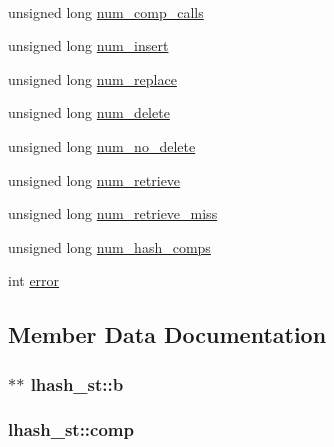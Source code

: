 \begin{DoxyCompactItemize}
$$\item 
unsigned long \hyperlink{structlhash__st_ae1b31884e484b59f563c6f81a4fa7d8a}{num\+\_\+comp\+\_\+calls}
\item 
unsigned long \hyperlink{structlhash__st_ada8ae86f682c0925b9f2b50975262017}{num\+\_\+insert}
\item 
unsigned long \hyperlink{structlhash__st_a6c301e9b9ec8e09f4bb6882d77f1757e}{num\+\_\+replace}
\item 
unsigned long \hyperlink{structlhash__st_aefe2bc9e1e050fbb114b26c31fca0879}{num\+\_\+delete}
\item 
unsigned long \hyperlink{structlhash__st_a54547ec18c8eb65436be64ed20981d30}{num\+\_\+no\+\_\+delete}
\item 
unsigned long \hyperlink{structlhash__st_a82b26dec352a27b9b886c305765c665f}{num\+\_\+retrieve}
\item 
unsigned long \hyperlink{structlhash__st_a387e6db76e41d95cdcdb97a518eda2a8}{num\+\_\+retrieve\+\_\+miss}
\item 
unsigned long \hyperlink{structlhash__st_a9e918c731a184cab5fa9a7919b3633c4}{num\+\_\+hash\+\_\+comps}
\item 
int \hyperlink{structlhash__st_aec4f09d46d46d5734bc1d66706533ed3}{error}
\end{DoxyCompactItemize}


\subsection{Member Data Documentation}
\subsubsection[{\texorpdfstring{b}{b}}]{$\ast$$\ast$ lhash\+\_\+st\+::b}\hypertarget{structlhash__st_a270d10bf31f3f917e12d700b27960458}{}\label{structlhash__st_a270d10bf31f3f917e12d700b27960458}
\subsubsection[{\texorpdfstring{comp}{comp}}]{ lhash\+\_\+st\+::comp}\hypertarget{structlhash__st_a225e9a348c78a6e7504855c6b07ebbb5}{}\label{structlhash__st_a225e9a348c78a6e7504855c6b07ebbb5}
